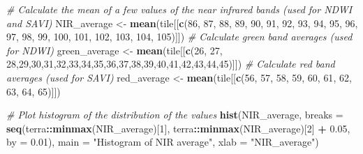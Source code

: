\documentclass[
]{article}
\newenvironment{Shaded}{\begin{snugshade}}{\end{snugshade}}
\newcommand{\AttributeTok}[1]{\textcolor[rgb]{0.13,0.29,0.53}{#1}}
\newcommand{\CommentTok}[1]{\textcolor[rgb]{0.56,0.35,0.01}{\textit{#1}}}
\newcommand{\DecValTok}[1]{\textcolor[rgb]{0.00,0.00,0.81}{#1}}
\newcommand{\FloatTok}[1]{\textcolor[rgb]{0.00,0.00,0.81}{#1}}
\newcommand{\FunctionTok}[1]{\textcolor[rgb]{0.13,0.29,0.53}{\textbf{#1}}}
\newcommand{\NormalTok}[1]{#1}
\newcommand{\OtherTok}[1]{\textcolor[rgb]{0.56,0.35,0.01}{#1}}
\newcommand{\SpecialCharTok}[1]{\textcolor[rgb]{0.81,0.36,0.00}{\textbf{#1}}}
\newcommand{\StringTok}[1]{\textcolor[rgb]{0.31,0.60,0.02}{#1}}
\begin{document}
\begin{Shaded}
\begin{Highlighting}[]
\CommentTok{\# Calculate the mean of a few values of the near infrared bands (used for NDWI and SAVI)}
\NormalTok{NIR\_average }\OtherTok{\textless{}{-}} \FunctionTok{mean}\NormalTok{(tile[[}\FunctionTok{c}\NormalTok{(}\DecValTok{86}\NormalTok{, }\DecValTok{87}\NormalTok{, }\DecValTok{88}\NormalTok{, }\DecValTok{89}\NormalTok{, }\DecValTok{90}\NormalTok{, }\DecValTok{91}\NormalTok{, }\DecValTok{92}\NormalTok{, }\DecValTok{93}\NormalTok{, }\DecValTok{94}\NormalTok{, }\DecValTok{95}\NormalTok{, }\DecValTok{96}\NormalTok{, }\DecValTok{97}\NormalTok{, }\DecValTok{98}\NormalTok{, }\DecValTok{99}\NormalTok{, }\DecValTok{100}\NormalTok{, }\DecValTok{101}\NormalTok{, }\DecValTok{102}\NormalTok{, }\DecValTok{103}\NormalTok{, }\DecValTok{104}\NormalTok{, }\DecValTok{105}\NormalTok{)]])}
\CommentTok{\# Calculate green band averages (used for NDWI)}
\NormalTok{green\_average }\OtherTok{\textless{}{-}} \FunctionTok{mean}\NormalTok{(tile[[}\FunctionTok{c}\NormalTok{(}\DecValTok{26}\NormalTok{, }\DecValTok{27}\NormalTok{, }\DecValTok{28}\NormalTok{,}\DecValTok{29}\NormalTok{,}\DecValTok{30}\NormalTok{,}\DecValTok{31}\NormalTok{,}\DecValTok{32}\NormalTok{,}\DecValTok{33}\NormalTok{,}\DecValTok{34}\NormalTok{,}\DecValTok{35}\NormalTok{,}\DecValTok{36}\NormalTok{,}\DecValTok{37}\NormalTok{,}\DecValTok{38}\NormalTok{,}\DecValTok{39}\NormalTok{,}\DecValTok{40}\NormalTok{,}\DecValTok{41}\NormalTok{,}\DecValTok{42}\NormalTok{,}\DecValTok{43}\NormalTok{,}\DecValTok{44}\NormalTok{,}\DecValTok{45}\NormalTok{)]])}
\CommentTok{\# Calculate red band averages (used for SAVI)}
\NormalTok{red\_average }\OtherTok{\textless{}{-}} \FunctionTok{mean}\NormalTok{(tile[[}\FunctionTok{c}\NormalTok{(}\DecValTok{56}\NormalTok{, }\DecValTok{57}\NormalTok{, }\DecValTok{58}\NormalTok{, }\DecValTok{59}\NormalTok{, }\DecValTok{60}\NormalTok{, }\DecValTok{61}\NormalTok{, }\DecValTok{62}\NormalTok{, }\DecValTok{63}\NormalTok{, }\DecValTok{64}\NormalTok{, }\DecValTok{65}\NormalTok{)]])}

\CommentTok{\# Plot histogram of the distribution of the values}
\FunctionTok{hist}\NormalTok{(NIR\_average, }\AttributeTok{breaks =} \FunctionTok{seq}\NormalTok{(terra}\SpecialCharTok{::}\FunctionTok{minmax}\NormalTok{(NIR\_average)[}\DecValTok{1}\NormalTok{], terra}\SpecialCharTok{::}\FunctionTok{minmax}\NormalTok{(NIR\_average)[}\DecValTok{2}\NormalTok{] }\SpecialCharTok{+} \FloatTok{0.05}\NormalTok{, }\AttributeTok{by =} \FloatTok{0.01}\NormalTok{),}
     \AttributeTok{main =} \StringTok{"Histogram of NIR average"}\NormalTok{, }\AttributeTok{xlab =} \StringTok{"NIR\_average"}\NormalTok{)}



\end{Highlighting}
\end{Shaded}
\end{document}
